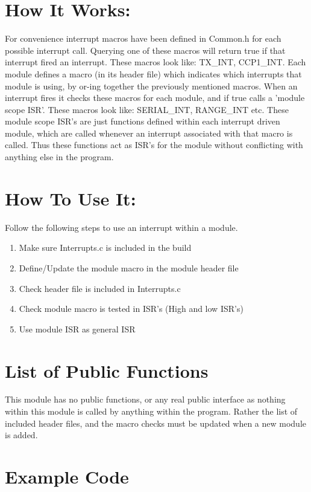 \documentclass[]{report}
\begin{document}
\section{How It Works:}
For convenience interrupt macros have been defined in Common.h for each possible interrupt call. Querying one of these macros will return true if that interrupt fired an interrupt. These macros look like: TX\_INT, CCP1\_INT.\newline
Each module defines a macro (in its header file) which indicates which interrupts that module is using, by or-ing together the previously mentioned macros. When an interrupt fires it checks these macros for each module, and if true calls a 'module scope ISR'. These macros look like: SERIAL\_INT, RANGE\_INT etc. \newline
These module scope ISR's are just functions defined within each interrupt driven module, which are called whenever an interrupt associated with that macro is called. Thus these functions act as ISR's for the module without conflicting with anything else in the program.

\section{How To Use It:}
Follow the following steps to use an interrupt within a module.
\begin{enumerate}
	\item Make sure Interrupts.c is included in the build
	\item Define/Update the module macro in the module header file
	\item Check header file is included in Interrupts.c
	\item Check module macro is tested in ISR's (High and low ISR's)
	\item Use module ISR as general ISR
\end{enumerate}

\section{List of Public Functions}
This module has no public functions, or any real public interface as nothing within this module is called by anything within the program. Rather the list of included header files, and the macro checks must be updated when a new module is added.

\section{Example Code}
\end{document}

